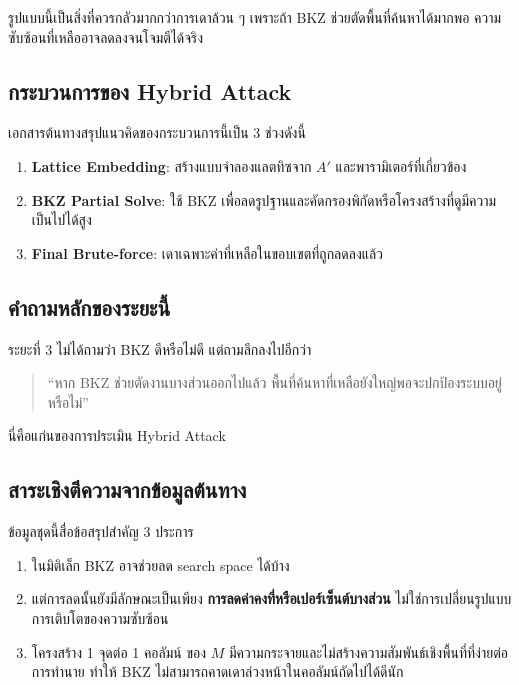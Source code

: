 \documentclass[12pt,a4paper]{article}
\newcommand{\term}[1]{\textbf{#1}}
\newcommand{\eng}[1]{\textenglish{#1}}
\begin{document}
	รูปแบบนี้เป็นสิ่งที่ควรกลัวมากกว่าการเดาล้วน ๆ เพราะถ้า \eng{BKZ} ช่วยตัดพื้นที่ค้นหาได้มากพอ ความซับซ้อนที่เหลืออาจลดลงจนโจมตีได้จริง
	
	\subsection{กระบวนการของ \eng{Hybrid Attack}}
	
	เอกสารต้นทางสรุปแนวคิดของกระบวนการนี้เป็น 3 ช่วงดังนี้
	\begin{enumerate}[label=\arabic*.]
		\item \term{Lattice Embedding}: สร้างแบบจำลองแลตทิซจาก $A'$ และพารามิเตอร์ที่เกี่ยวข้อง
		\item \term{BKZ Partial Solve}: ใช้ \eng{BKZ} เพื่อลดรูปฐานและคัดกรองพิกัดหรือโครงสร้างที่ดูมีความเป็นไปได้สูง
		\item \term{Final Brute-force}: เดาเฉพาะค่าที่เหลือในขอบเขตที่ถูกลดลงแล้ว
	\end{enumerate}
	
	\subsection{คำถามหลักของระยะนี้}
	
	ระยะที่ 3 ไม่ได้ถามว่า \eng{BKZ} ดีหรือไม่ดี แต่ถามลึกลงไปอีกว่า
	\begin{quote}
		``หาก \eng{BKZ} ช่วยตัดงานบางส่วนออกไปแล้ว พื้นที่ค้นหาที่เหลือยังใหญ่พอจะปกป้องระบบอยู่หรือไม่''
	\end{quote}
	
	นี่คือแก่นของการประเมิน \eng{Hybrid Attack}
	
	\subsection{สาระเชิงตีความจากข้อมูลต้นทาง}
	
	ข้อมูลชุดนี้สื่อข้อสรุปสำคัญ 3 ประการ
	\begin{enumerate}[label=\arabic*.]
		\item ในมิติเล็ก \eng{BKZ} อาจช่วยลด \eng{search space} ได้บ้าง
		\item แต่การลดนั้นยังมีลักษณะเป็นเพียง \term{การลดค่าคงที่หรือเปอร์เซ็นต์บางส่วน} ไม่ใช่การเปลี่ยนรูปแบบการเติบโตของความซับซ้อน
		\item โครงสร้าง \eng{1 จุดต่อ 1 คอลัมน์} ของ $M$ มีความกระจายและไม่สร้างความสัมพันธ์เชิงพื้นที่ที่ง่ายต่อการทำนาย ทำให้ \eng{BKZ} ไม่สามารถคาดเดาล่วงหน้าในคอลัมน์ถัดไปได้ดีนัก
	\end{enumerate}
	
\end{document}
